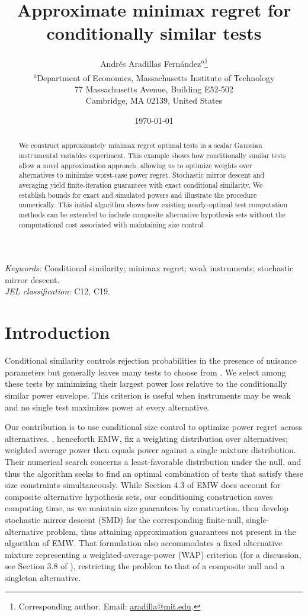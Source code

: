 \documentclass[11pt]{article}
\title{Approximate minimax regret for conditionally similar tests}
\author{Andr\'es Aradillas Fern\'andez\textsuperscript{a}\thanks{Corresponding author. Email: \href{mailto:aradilla@mit.edu}{aradilla@mit.edu}.}\\[4pt] \small\textsuperscript{a}Department of Economics, Massachusetts Institute of Technology\\ \small 77 Massachusetts Avenue, Building E52-502\\ \small Cambridge, MA 02139, United States}
\date{\today}
\begin{document}
\maketitle
\begin{abstract}
We construct approximately minimax regret optimal tests in a scalar Gaussian instrumental variables experiment. This example shows how conditionally similar tests allow a novel approximation approach, allowing us to optimize weights over alternatives to minimize worst-case power regret. Stochastic mirror descent and averaging yield finite-iteration guarantees with exact conditional similarity. We establish bounds for exact and simulated powers and illustrate the procedure numerically. This initial algorithm shows how existing nearly-optimal test computation methods can be extended to include composite alternative hypothesis sets without the computational cost associated with maintaining size control.
\end{abstract}
\noindent\textit{Keywords:} Conditional similarity; minimax regret; weak instruments; stochastic mirror descent.\\
\textit{JEL classification:} C12, C19.

\section{Introduction}

Conditional similarity controls rejection probabilities in the presence of nuisance parameters but generally leaves many tests to choose from \citep{moreira2003conditional}. We select among these tests by minimizing their largest power loss relative to the conditionally similar power envelope. This criterion is useful when instruments may be weak and no single test maximizes power at every alternative.

Our contribution is to use conditional size control to optimize power regret across alternatives. \citet{elliott2015nearly}, henceforth EMW, fix a weighting distribution over alternatives; weighted average power then equals power against a single mixture distribution. Their numerical search concerns a least-favorable distribution under the null, and thus the algorithm seeks to find an optimal combination of tests that satisfy these size constraints simultaneously. While Section 4.3 of EMW does account for composite alternative hypothesis sets, our conditioning construction saves computing time, as we maintain size guarantees by construction. \citet{aradillas2025approximate} then develop stochastic mirror descent (SMD) for the corresponding finite-null, single-alternative problem, thus attaining approximation guarantees not present in the algorithm of EMW. That formulation also accommodates a fixed alternative mixture representing a weighted-average-power (WAP) criterion (for a discussion, see Section 3.8 of \cite{lehmann2005testing}), restricting the problem to that of a composite null and a singleton alternative.
\end{document}
